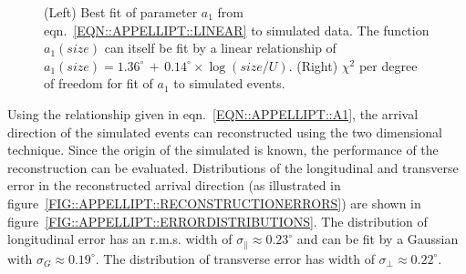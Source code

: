 \begin{figure}[p]
%
\caption{\label{FIG::APPELLIPT::ELLIPTANDCHISQ} (Left) Best fit of 
parameter $a_1$ from eqn.~\ref{EQN::APPELLIPT::LINEAR} to simulated data.
The function $a_1(size)$ can itself be fit by a linear relationship of
$a_1(size)=1.36^\circ\,+\,0.14^\circ\times\log(size/U)$. (Right) $\chi^2$
per degree of freedom for fit of $a_1$ to simulated events.}
\end{figure}
\clearpage

Using the relationship given in eqn.~\ref{EQN::APPELLIPT::A1}, the
arrival direction of the simulated events can reconstructed using the
two dimensional technique. Since the origin of the simulated \Grays is
known, the performance of the reconstruction can be
evaluated. Distributions of the longitudinal and transverse error in
the reconstructed arrival direction (as illustrated in
figure~\ref{FIG::APPELLIPT::RECONSTRUCTIONERRORS}) are shown in
figure~\ref{FIG::APPELLIPT::ERRORDISTRIBUTIONS}. The distribution of
longitudinal error has an r.m.s. width of
$\sigma_\parallel\approx0.23^\circ$ and can be fit by a Gaussian with
$\sigma_{G}\approx0.19^\circ$. The distribution of transverse error
has width of $\sigma_\perp\approx0.22^\circ$. 

